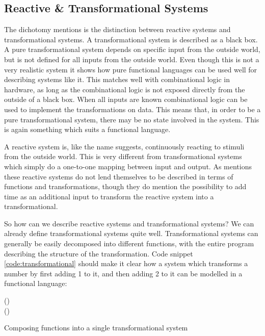 \subsection{Reactive \& Transformational Systems}
The dichotomy \cite{harel1985development} mentions is the distinction between reactive systems and transformational systems.
A transformational system is described as a black box. 
A pure transformational system depends on specific input from the outside world, but is not defined for all inputs from the outside world.
Even though this is not a very realistic system it shows how pure functional languages can be used well for describing systems like it.
This matches well with combinational logic in hardware, as long as the combinational logic is not exposed directly from the outside of a black box. 
When all inputs are known combinational logic can be used to implement the transformations on data. 
This means that, in order to be a pure transformational system, there may be no state involved in the system. 
This is again something which suits a functional language. 

A reactive system is, like the name suggests, continuously reacting to stimuli from the outside world. 
This is very different from transformational systems which simply do a one-to-one mapping between input and output.
As \cite{harel1985development} mentions these reactive systems do not lend themselves to be described in terms of functions and transformations, though they do mention the possibility to add time as an additional input to transform the reactive system into a transformational.

So how can we describe reactive systems and transformational systems?
We can already define transformational systems quite well. 
Transformational systems can generally be easily decomposed into different functions, with the entire program describing the structure of the transformation. 
Code snippet \ref{code:transformational} should make it clear how a system which transforms a number by first adding 1 to it, and then adding 2 to it can be modelled in a functional language:
\begin{source}
\begin{hscode}\SaveRestoreHook
{}%
%
\>[B]{}\mathrel{=}(\mathbin{+}){}\<[E]%
\\[\blanklineskip]%
\>[B]{}\mathrel{=}(\mathbin{+}){}\<[E]%
\\[\blanklineskip]%
\>[B]{}\mathrel{=}\mathbin{\circ}\<[E]%
\ColumnHook
\end{hscode}\resethooks
\caption{Composing functions into a single transformational system} \label{code:transformational}
\end{source}

